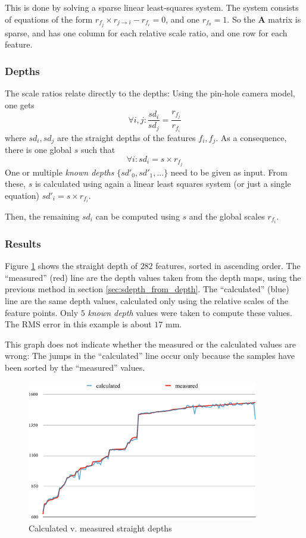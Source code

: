 \documentclass{scrreprt}
\newcommand{\matr}[1]{\mathbf{#1}}
\begin{document}
This is done by solving a sparse linear least-squares system. The system consists of equations of the form $r_{f_j} \times r_{j\rightarrow i} - r_{f_i} = 0$, and one $r_{f_0} = 1$. So the $\matr{A}$ matrix is sparse, and has one column for each relative scale ratio, and one row for each feature.


\subsubsection{Depths}
The scale ratios relate directly to the depths: Using the pin-hole camera model, one gets
\begin{equation*}
\forall i,j : \frac{sd_i}{sd_j} = \frac{r_{f_j}}{r_{f_i}}
\end{equation*}
where $sd_i, sd_j$ are the straight depths of the features $f_i, f_j$. As a consequence, there is one global $s$ such that
\begin{equation*}
\forall i : sd_{i} = s \times r_{f_j}
\end{equation*}
One or multiple \emph{known depths} $\{ sd'_0, sd'_1, ... \}$ need to be given as input. From these, $s$ is calculated using again a linear least squares system (or just a single equation) $sd'_{i} = s \times r_{f_i}$.

Then, the remaining $sd_i$ can be computed using $s$ and the global scales $r_{f_i}$.

\subsubsection{Results}
Figure \ref{fig:depthcomp} shows the straight depth of $282$ features, sorted in ascending order. The ``measured'' (red) line are the depth values taken from the depth maps, using the previous method in section \ref{sec:sdepth_from_depth}. The ``calculated'' (blue) line are the same depth values, calculated only using the relative scales of the feature points. Only $5$ \emph{known depth} values were taken to compute these values. The RMS error in this example is about $17 \text{ mm}$.

This graph does not indicate whether the measured or the calculated values are wrong: The jumps in the ``calculated'' line occur only because the samples have been sorted by the ``measured'' values.

\begin{figure}
\centering
\includegraphics[width=0.9\textwidth]{depthcomp.pdf}
\caption{Calculated v. measured straight depths}
\label{fig:depthcomp}
\end{figure}
\end{document}
